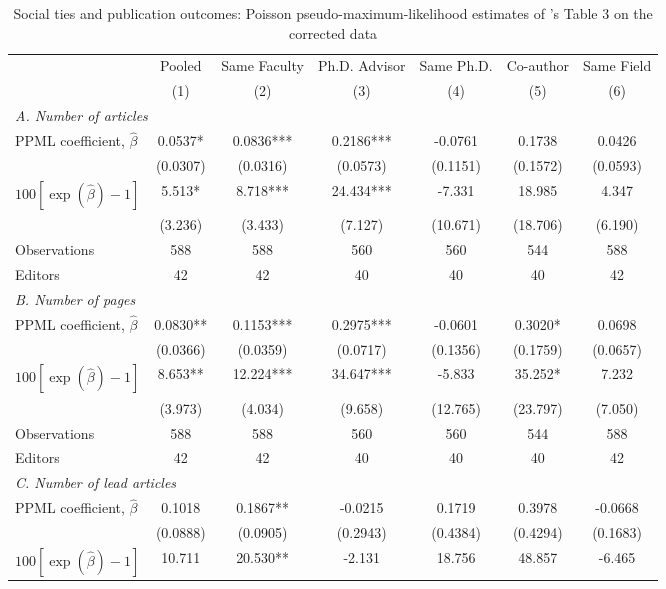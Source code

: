 \begin{table}[!htbp]
\renewcommand{\arraystretch}{1.0}
\centering
{}
\caption{Social ties and publication outcomes: Poisson pseudo-maximum-likelihood estimates of \citeauthor{Colussi2018}'s \citeyearpar[p. 49]{Colussi2018} Table 3 on the corrected data}
\label{tab:ppml_table3}
\small
\setlength{\tabcolsep}{3pt}
\begin{tabular}{lcccccc}
\toprule
 & Pooled & Same Faculty & Ph.D. Advisor & Same Ph.D. & Co-author & Same Field \\
 & (1) & (2) & (3) & (4) & (5) & (6) \\
\midrule
\multicolumn{7}{l}{\textit{A. Number of articles}} \\[2pt]
\quad PPML coefficient, $\hat\beta$ & 0.0537* & 0.0836*** & 0.2186*** & -0.0761 & 0.1738 & 0.0426 \\
 & (0.0307) & (0.0316) & (0.0573) & (0.1151) & (0.1572) & (0.0593) \\
\quad $100[\exp(\hat\beta)-1]$ & 5.513* & 8.718*** & 24.434*** & -7.331 & 18.985 & 4.347 \\
 & (3.236) & (3.433) & (7.127) & (10.671) & (18.706) & (6.190) \\
\quad Observations & 588 & 588 & 560 & 560 & 544 & 588 \\
\quad Editors & 42 & 42 & 40 & 40 & 40 & 42 \\[8pt]
\multicolumn{7}{l}{\textit{B. Number of pages}} \\[2pt]
\quad PPML coefficient, $\hat\beta$ & 0.0830** & 0.1153*** & 0.2975*** & -0.0601 & 0.3020* & 0.0698 \\
 & (0.0366) & (0.0359) & (0.0717) & (0.1356) & (0.1759) & (0.0657) \\
\quad $100[\exp(\hat\beta)-1]$ & 8.653** & 12.224*** & 34.647*** & -5.833 & 35.252* & 7.232 \\
 & (3.973) & (4.034) & (9.658) & (12.765) & (23.797) & (7.050) \\
\quad Observations & 588 & 588 & 560 & 560 & 544 & 588 \\
\quad Editors & 42 & 42 & 40 & 40 & 40 & 42 \\[8pt]
\multicolumn{7}{l}{\textit{C. Number of lead articles}} \\[2pt]
\quad PPML coefficient, $\hat\beta$ & 0.1018 & 0.1867** & -0.0215 & 0.1719 & 0.3978 & -0.0668 \\
 & (0.0888) & (0.0905) & (0.2943) & (0.4384) & (0.4294) & (0.1683) \\
\quad $100[\exp(\hat\beta)-1]$ & 10.711 & 20.530** & -2.131 & 18.756 & 48.857 & -6.465 \\

\end{tabular}
\end{table}

